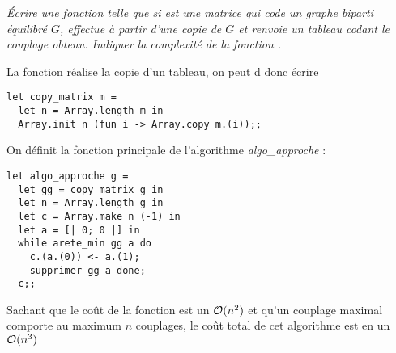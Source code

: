 \begin{Exercise}\it
Écrire une fonction  telle que si  est une matrice qui code un graphe biparti équilibré $G$,  effectue  à partir d'une copie de $G$ et renvoie un tableau codant le couplage obtenu.
Indiquer la complexité de la fonction .
\end{Exercise}
\begin{Answer}
La fonction  réalise la copie d'un tableau, on peut d donc écrire
\begin{lstlisting}
let copy_matrix m = 
  let n = Array.length m in
  Array.init n (fun i -> Array.copy m.(i));;
\end{lstlisting}
On définit la fonction principale de l'algorithme \emph{algo\_approche} :
\begin{lstlisting}
let algo_approche g =
  let gg = copy_matrix g in
  let n = Array.length g in
  let c = Array.make n (-1) in
  let a = [| 0; 0 |] in
  while arete_min gg a do
    c.(a.(0)) <- a.(1);
    supprimer gg a done;
  c;;
\end{lstlisting}
Sachant que le coût de la fonction  est un ${\cal O}(n^2)$ et qu'un couplage maximal comporte au maximum $n$ couplages, le coût total de cet algorithme est en un ${\cal O}(n^3)$
\end{Answer}
\newpage
